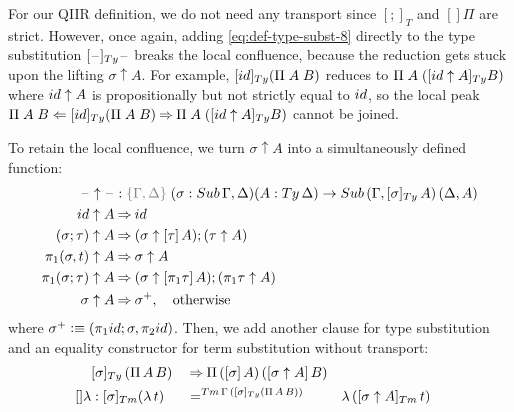 \documentclass[a4paper,UKenglish,numberwithinsect,cleveref,thm-restate]{lipics-v2021}
\begin{document}
For our QIIR definition, %
we do not need any transport since $[;]_T$ and $[]\Pi$ are strict.
However, once again, adding \eqref{eq:def-type-subst-8} directly to the type substitution $[\blank]_{\Ty}\blank$ breaks the local confluence, because the reduction gets stuck upon the lifting $\sigma \uparrow A$.
For example, $[\idS]_{\Ty}(\Pi\;A\;B)$ reduces to $\Pi\;A\;([\idS \uparrow A]_{\Ty}B)$ where $\idS \uparrow A$ is propositionally but not strictly equal to $\idS$, so the local peak $\Pi\;A\;B \Leftarrow [\idS]_{\Ty}(\Pi\;A\;B) \reduce \Pi\;A\;([\idS \uparrow A]_{\Ty}B)$ cannot be joined. 

To retain the local confluence, we turn $\sigma \uparrow A$ into a simultaneously defined function:
\begin{alignat}{3}
  \blank\uparrow \blank & : \implicit{\Gamma, \Delta}\; (\sigma : \Sub\,\Gamma,\Delta) (A : \Ty\,\Delta) \to \Sub\,(\Gamma, [\sigma]_{\Ty}\,A)\, (\Delta, A) \label{eq:type-of-lifting} \\
\idS                \uparrow A & \reduce \idS \nonumber \\
(\sigma ; \tau)     \uparrow A & \reduce (\sigma \uparrow \sub{\tau}{A} ) ; (\tau \uparrow A) \nonumber \\
\pi_1(\sigma, t)    \uparrow A & \reduce \sigma \uparrow A \nonumber \\
\pi_1(\sigma; \tau) \uparrow A & \reduce (\sigma \uparrow \sub{\pi_1 \tau}{A}) ; (\pi_1 \tau \uparrow A)\nonumber \\
\sigma              \uparrow A & \reduce \sigma^+ , \quad \text{otherwise} \nonumber
\end{alignat}
where $\sigma^+ \defeq (\pi_1\idS ; \sigma, \pi_2\idS)$.
Then, we add another clause for type substitution and an equality constructor for term substitution without transport:
\begin{alignat}{5}
                     & [ \sigma ]_{\Ty}\,(\Pi\,A\,B) && \reduce \Pi\,(\sub{\sigma}{A})\,(\sub{\sigma\uparrow A}{B}) \label{eq:def-type-subst-9} \\
  \mathsf{[]\lambda} & : [\sigma]_{\Tm} (\lambda\,t) && =^{\Tm\,\Gamma\,([\sigma]_{\Ty}(\Pi\,A\,B))} && \lambda\,([\sigma \uparrow A]_{\Tm}\,t) \nonumber
\end{alignat}
\end{document}
